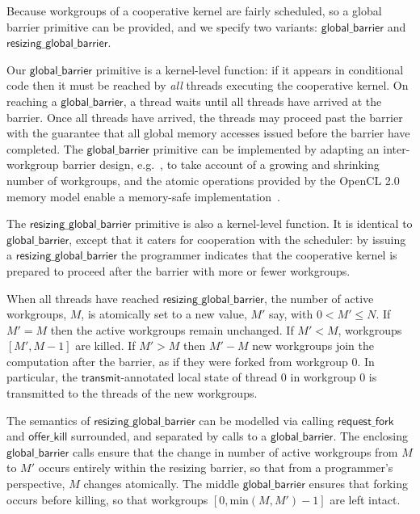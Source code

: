 \documentclass[sigconf]{acmart}
\newcommand{\transmit}{\mathsf{transmit}}
\newcommand{\offerfork}{\mathsf{request\_fork}}
\newcommand{\offerkill}{\mathsf{offer\_kill}}
\newcommand{\globalbarrier}{\mathsf{global\_barrier}}
\newcommand{\resizingglobalbarrier}{\mathsf{resizing\_global\_barrier}}
\begin{document}
{%
%
Because workgroups of a cooperative kernel are fairly scheduled, so a
global barrier primitive can be provided, and we specify two variants: $\globalbarrier$
and $\resizingglobalbarrier$.

Our $\globalbarrier$ primitive is a kernel-level function: if it
appears in conditional code then it must be reached by \emph{all}
threads executing the cooperative kernel.  On reaching a
$\globalbarrier$, a thread waits until all threads have arrived at
the barrier.  Once all threads have arrived, the threads may proceed
past the barrier with the guarantee that all global memory accesses
issued before the barrier have completed.  The $\globalbarrier$
primitive can be implemented by adapting an inter-workgroup barrier
design, e.g.~\cite{XF10}, to take account of a growing and shrinking number of workgroups, and the atomic operations provided by
the OpenCL 2.0 memory model enable a memory-safe
implementation~\cite{DBLP:conf/oopsla/SorensenDBGR16}.  

The $\resizingglobalbarrier$ primitive is also a kernel-level
function.  It is identical to $\globalbarrier$, except that it caters
for cooperation with the scheduler: by issuing a
$\resizingglobalbarrier$ the programmer indicates that the cooperative
kernel is prepared to proceed after the barrier with more or fewer workgroups.

When all threads have reached $\resizingglobalbarrier$,
the number of active workgroups, $M$, is atomically set to a new value, $M'$ say, with $0 < M' \leq N$.
If $M' = M$ then the active workgroups remain unchanged.  If $M' < M$, workgroups $[M', M-1]$ are
killed.  If $M' > M$ then $M'-M$ new workgroups join the computation after the barrier,
as if they were forked from workgroup 0.  In particular, the
$\transmit$-annotated local state of thread 0 in workgroup 0 is
transmitted to the threads of the new workgroups.

The semantics of $\resizingglobalbarrier$ can be modelled via calling $\offerfork$ and $\offerkill$
surrounded, and separated by calls to a $\globalbarrier$.
%
%
The enclosing $\globalbarrier$ calls ensure that the change in number
of active workgroups from $M$ to $M'$ occurs entirely within the
resizing barrier, so that from a programmer's perspective, $M$ changes
atomically.  The middle $\globalbarrier$ ensures that forking occurs
before killing, so that workgroups $[0, \textrm{min}(M, M') - 1]$ are
left intact.

}
\end{document}
